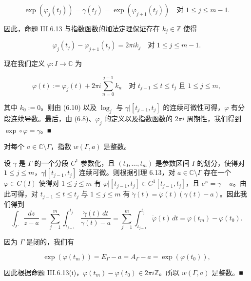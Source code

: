 \begin{lemma}
\begin{subitems}
\[
\exp\left(\varphi_{j}(t_{j})\right) = \gamma(t_{j}) = \exp\left(\varphi_{j+1}(t_{j})\right) \quad \text{对 } 1 \le j \le m - 1 .
\]

因此，命题 III.6.13 与指数函数的加法定理保证存在 $ k_{j} \in \mathbb{Z} $ 使得

\begin{equation}
\varphi_{j}(t_{j}) - \varphi_{j+1}(t_{j}) = 2\pi ik_{j} \quad \text{对 } 1 \le j \le m - 1 .\tag{6.10}
\end{equation}

现在我们定义 $ \varphi : I \to \mathbb{C} $ 为

\begin{equation}
\varphi(t) := \varphi_{j}(t) + 2\pi i\sum_{n=0}^{j-1}k_{n} \quad \text{对 } t_{j-1} \le t \le t_{j} \text{ 且 } 1 \le j \le m ,\tag{6.11}
\end{equation}

其中 $ k_{0} := 0 $。则由 (6.10) 以及 $ \log_{j} $ 与 $ \gamma|[t_{j-1},t_{j}] $ 的连续可微性可得，$ \varphi $ 有分段连续导数。最后，由 (6.8)、$ \varphi_{j} $ 的定义以及指数函数的 $ 2\pi i $ 周期性，我们得到 $ \exp\circ\varphi = \gamma $。\nobreak\hspace{0.35em}■

\end{subitems}

\end{lemma}

\begin{theorem}

对每个 $ a \in \mathbb{C}\setminus\Gamma $，指数 $ w(\Gamma,a) $ 是整数。

\proofhead
设 $ \gamma $ 是 $ \Gamma $ 的一个分段 $ C^{1} $ 参数化，且 $ (t_{0},\ldots,t_{m}) $ 是参数区间 $ I $ 的划分，使得对 $ 1 \le j \le m $，$ \gamma|[t_{j-1},t_{j}] $ 连续可微。则根据引理 6.13，对 $ a \in \mathbb{C}\setminus\Gamma $ 存在一个 $ \varphi \in C(I) $ 使得对 $ 1 \le j \le m $ 有 $ \varphi|[t_{j-1},t_{j}] \in C^{1}[t_{j-1},t_{j}] $，且 $ e^{\varphi} = \gamma - a $。由此可得，对 $ t_{j-1} \le t \le t_{j} $ 与 $ 1 \le j \le m $ 有 $ \dot\gamma(t) = \dot\varphi(t)\left(\gamma(t) - a\right) $。因此我们得到
\begin{equation}
\int_{\Gamma}\frac{dz}{z - a} = \sum_{j=1}^{m}\int_{t_{j-1}}^{t_{j}}\frac{\dot\gamma(t)\,dt}{\gamma(t) - a} = \sum_{j=1}^{m}\int_{t_{j-1}}^{t_{j}}\dot\varphi(t)\,dt = \varphi(t_{m}) - \varphi(t_{0}) .\tag{6.12}
\end{equation}

因为 $ \Gamma $ 是闭的，我们有

\[
\exp\left(\varphi(t_{m})\right) = E_{\Gamma} - a = A_{\Gamma} - a = \exp\left(\varphi(t_{0})\right) ,
\]

因此根据命题 III.6.13(i)，$ \varphi(t_{m}) - \varphi(t_{0}) \in 2\pi i\mathbb{Z} $。所以 $ w(\Gamma,a) $ 是整数。\nobreak\hspace{0.35em}■

\end{theorem}

